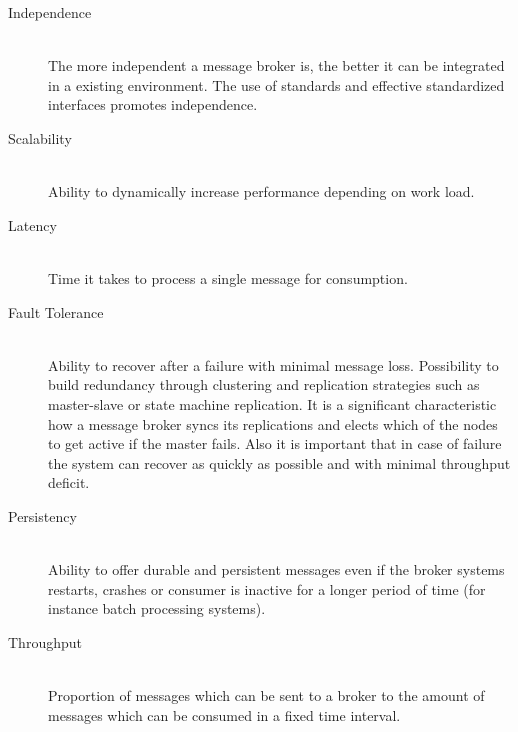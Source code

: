 \begin{description}
    \item [Independence] \hfill \\
    {   The more independent a
        message broker is, the better it can be integrated in a existing
        environment. The use of standards and effective standardized interfaces
        promotes independence.}
        
    \item [Scalability] \hfill \\
    {    Ability to dynamically increase performance depending on work load. }
    \item [Latency]\hfill \\
    {    Time it takes to process a single message for consumption.  }
    \item [Fault Tolerance] \hfill \\
    {    Ability to recover after a failure with minimal message loss.
            Possibility to build redundancy through clustering and
            replication strategies such as master-slave or state machine
            replication. It is a significant characteristic how a
            message broker syncs its replications and elects which of the nodes
            to get active if the master fails. Also it is important that in case
            of failure the system can recover as quickly as possible and with
            minimal throughput deficit.   }
    \item [Persistency] \hfill \\ 
        {Ability to offer durable and persistent messages even if the broker
            systems restarts, crashes or consumer is inactive for a longer period of time
            (for instance batch processing systems). }
    \item [Throughput] \hfill \\
        {Proportion of messages which can be sent to a broker to the amount of
        messages which can be consumed in a fixed time interval.}
\end{description}


